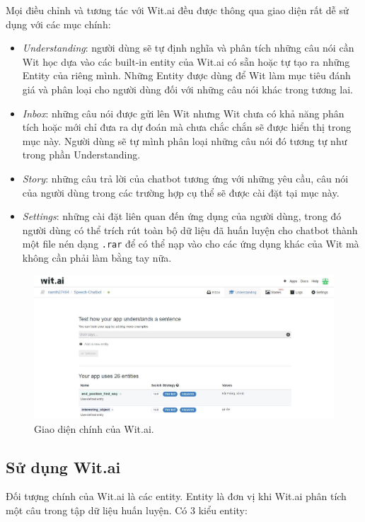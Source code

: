 \documentclass[12pt]{report}
\begin{document}
Mọi điều chỉnh và tương tác với Wit.ai đều được thông qua giao diện rất dễ sử dụng với các mục chính:

\begin{itemize}
	\item \textit{Understanding}: người dùng sẽ tự định nghĩa và phân tích những câu nói cần Wit học dựa vào các built-in entity của Wit.ai có sẵn hoặc tự tạo ra những Entity của riêng mình. Những Entity được dùng để Wit làm mục tiêu đánh giá và phân loại cho người dùng đối với những câu nói khác trong tương lai.
	\item \textit{Inbox}: những câu nói được gửi lên Wit nhưng Wit chưa có khả năng phân tích hoặc mới chỉ đưa ra dự đoán mà chưa chắc chắn sẽ được hiển thị trong mục này. Người dùng sẽ tự mình phân loại những câu nói đó tương tự như trong phần Understanding.
	\item \textit{Story}: những câu trả lời của chatbot tương ứng với những yêu cầu, câu nói của người dùng trong các trường hợp cụ thể sẽ được cài đặt tại mục này.
	\item \textit{Settings}: những cài đặt liên quan đến ứng dụng của người dùng, trong đó người dùng có thể trích rút toàn bộ dữ liệu đã huấn luyện cho chatbot thành một file nén dạng \texttt{.rar} để có thể nạp vào cho các ứng dụng khác của Wit mà không cần phải làm bằng tay nữa.
\end{itemize}

\begin{figure}[H] \label{fig:mainboard-wit}
	\centering
	\includegraphics[width=13cm]{Pics/Chap6/wit-mainboard.JPG}
	\caption{Giao diện chính của Wit.ai.}
\end{figure}

\subsection{Sử dụng Wit.ai}

Đối tượng chính của Wit.ai là các entity. Entity là đơn vị khi Wit.ai phân tích một câu trong tập dữ liệu huấn luyện. Có 3 kiểu entity:
\end{document}
